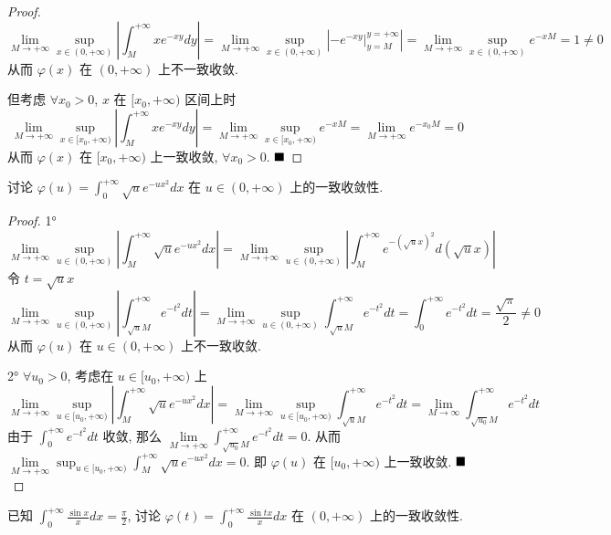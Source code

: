 \documentclass[lang=cn,newtx,10pt,scheme=chinese]{elegantbook}
\begin{document}
\begin{proof}
$$ \lim\limits_{M \to +\infty} \sup_{x \in (0, +\infty)} \left| \int_M^{+\infty} xe^{-xy} dy \right| = \lim\limits_{M \to +\infty} \sup_{x \in (0, +\infty)}  \left| -e^{-xy} |_{y=M}^{y=+\infty} \right|  = \lim\limits_{M \to +\infty} \sup_{x \in (0, +\infty)} e^{-xM} = 1 \neq 0 $$
从而 $\varphi(x)$ 在 $(0, +\infty)$ 上不一致收敛.

但考虑 $\forall x_0 > 0$, $x$ 在 $[x_0, +\infty)$ 区间上时
$$ \lim\limits_{M \to +\infty} \sup_{x \in [x_0, +\infty)} \left| \int_M^{+\infty} x e^{-xy} dy \right| = \lim\limits_{M \to +\infty} \sup_{x \in [x_0, +\infty)} e^{-xM} = \lim\limits_{M \to +\infty} e^{-x_0 M} = 0 $$
从而 $\varphi(x)$ 在 $[x_0, +\infty)$ 上一致收敛, $\forall x_0 > 0$.
$\hfill \blacksquare$
\end{proof}

\begin{example}{\label{ex13.2.3}}
讨论 $\varphi(u) = \int_{0}^{+\infty} \sqrt{u}e^{-ux^2} dx$ 在 $u \in (0, +\infty)$ 上的一致收敛性.
\end{example}

\begin{proof}
1°
$$ \lim\limits_{M \to +\infty} \sup_{u \in (0, +\infty)} \left| \int_M^{+\infty} \sqrt{u} e^{-ux^2} dx \right| = \lim\limits_{M \to +\infty} \sup_{u \in (0, +\infty)} \left| \int_M^{+\infty} e^{-(\sqrt{u}x)^2} d(\sqrt{u}x) \right| $$
令 $t = \sqrt{u}x$
$$ \lim\limits_{M \to +\infty} \sup_{u \in (0, +\infty)} \left| \int_{\sqrt{u}M}^{+\infty} e^{-t^2} dt \right| = \lim\limits_{M \to +\infty} \sup_{u \in (0, +\infty)} \int_{\sqrt{u}M}^{+\infty} e^{-t^2} dt = \int_0^{+\infty} e^{-t^2} dt = \frac{\sqrt{\pi}}{2} \neq 0 $$
从而 $\varphi(u)$ 在 $u \in (0, +\infty)$ 上不一致收敛.

2° $\forall u_0 > 0$, 考虑在 $u \in [u_0, +\infty)$ 上
$$ \lim\limits_{M \to +\infty} \sup_{u \in [u_0, +\infty)} \left| \int_M^{+\infty} \sqrt{u} e^{-ux^2} dx \right| = \lim\limits_{M \to +\infty} \sup_{u \in [u_0, +\infty)} \int_{\sqrt{u}M}^{+\infty} e^{-t^2} dt = \lim_{M \to \infty} \int_{\sqrt{u_0}M}^{+\infty} e^{-t^2} dt $$
由于 $\int_0^{+\infty} e^{-t^2} dt$ 收敛, 那么 $\lim\limits_{M \to +\infty} \int_{\sqrt{u_0}M}^{+\infty} e^{-t^2} dt = 0$.
从而 $\lim\limits_{M \to +\infty} \sup_{u \in [u_0, +\infty)} \int_M^{+\infty} \sqrt{u} e^{-ux^2} dx = 0$.
即 $\varphi(u)$ 在 $[u_0, +\infty)$ 上一致收敛.
$\hfill \blacksquare$
\end{proof}

\begin{example}[$\bigstar$]{\label{ex13.2.4}}
已知 $\int_{0}^{+\infty} \frac{\sin x}{x} dx = \frac{\pi}{2}$, 讨论 $\varphi(t) = \int_{0}^{+\infty} \frac{\sin tx}{x} dx$ 在 $(0, +\infty)$ 上的一致收敛性.
\end{example}
\end{document}
